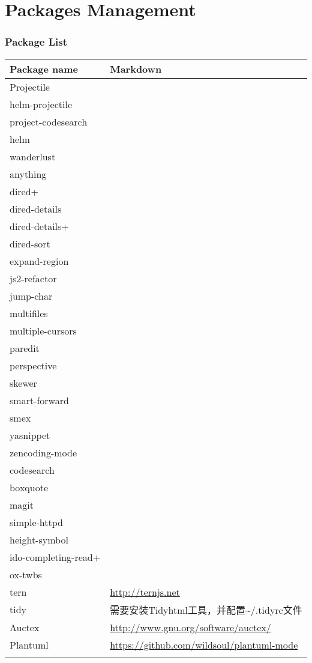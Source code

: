 \documentclass[10pt,a4paper]{article}
\begin{document}
\section{Packages Management}
\label{sec-4}
\subsubsection{Package List}
\label{sec-4-0-1}
\begin{center}
\begin{tabular}{ll}
Package name & Markdown\\
\hline
Projectile & \\
helm-projectile & \\
project-codesearch & \\
helm & \\
wanderlust & \\
anything & \\
dired+ & \\
dired-details & \\
dired-details+ & \\
dired-sort & \\
expand-region & \\
js2-refactor & \\
jump-char & \\
multifiles & \\
multiple-cursors & \\
paredit & \\
perspective & \\
skewer & \\
smart-forward & \\
smex & \\
yasnippet & \\
zencoding-mode & \\
codesearch & \\
boxquote & \\
magit & \\
simple-httpd & \\
height-symbol & \\
ido-completing-read+ & \\
ox-twbs & \\
tern & \url{http://ternjs.net}\\
tidy & 需要安装Tidyhtml工具，并配置\textasciitilde{}/.tidyrc文件\\
Auctex & \url{http://www.gnu.org/software/auctex/}\\
Plantuml & \url{https://github.com/wildsoul/plantuml-mode}\\
 & \\
\end{tabular}
\end{center}
\end{document}
